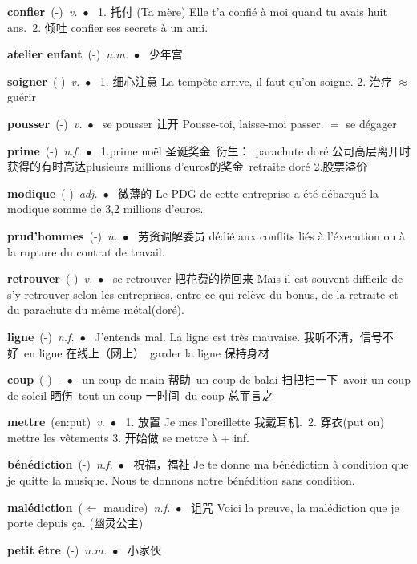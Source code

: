 \documentclass[10pt,a4paper,twoside]{article} %
\newcommand{\entry}[4]{\textbf{#1}\ {(#2)}\ \textit{#3}\ $\bullet$\ {#4}} %
\begin{document}
\begin{CJK*}{UTF8}{gkai}
\begin{multicols}{2}
\entry{confier}{-}{v.}
{
1. 托付 (Ta mère) Elle t'a confié à moi quand tu avais huit ans.\ 
2. 倾吐 confier ses secrets à un ami.
}

\entry{atelier enfant}{-}{n.m.}
{
少年宫
}

\entry{soigner}{-}{v.}
{
1. 细心注意 La tempête arrive, il faut qu'on soigne.
2. 治疗 $\approx$ guérir
}

\entry{pousser}{-}{v.}
{
se pousser 让开 Pousse-toi, laisse-moi passer. $=$ se dégager
}

\entry{prime}{-}{n.f.}
{
1.prime noël 圣诞奖金\ 
衍生：\ 
parachute doré 公司高层离开时获得的有时高达plusieurs millions d'euros的奖金\ 
retraite doré
2.股票溢价
}

\entry{modique}{-}{adj.}
{
微薄的 Le PDG de cette entreprise a été débarqué la modique somme de 3,2 millions d'euros.
}

\entry{prud'hommes}{-}{n.}
{
劳资调解委员 dédié aux conflits liés à l'éxecution ou à la rupture du contrat de travail.
}

\entry{retrouver}{-}{v.}
{
se retrouver 把花费的捞回来 Mais il est souvent difficile de s'y retrouver selon les entreprises, entre 
ce qui relève du bonus, de la retraite et du parachute du même métal(doré).
}

\entry{ligne}{-}{n.f.}
{
J'entends mal. La ligne est très mauvaise. 我听不清，信号不好\ 
en ligne 在线上（网上）\ garder la ligne 保持身材
}

\entry{coup}{-}{-}
{
un coup de main 帮助\ un coup de balai 扫把扫一下\ avoir un coup de soleil 晒伤\ 
tout un coup 一时间\ du coup 总而言之\ 
}

\entry{mettre}{en:put}{v.}
{
1. 放置 Je mes l'oreillette 我戴耳机.\ 
2. 穿衣(put on) mettre les vêtements
3. 开始做 se mettre à + inf.
}

\entry{bénédiction}{-}{n.f.}
{
祝福，福祉 Je te donne ma bénédiction à condition que je quitte la musique. Nous te donnons notre bénédition sans condition.
}

\entry{malédiction}{$\Leftarrow$ maudire}{n.f.}
{
诅咒 Voici la preuve, la malédiction que je porte depuis ça. (幽灵公主)
}

\entry{petit être}{-}{n.m.}
{
小家伙
}

\end{multicols}



\end{CJK*}
\end{document}
